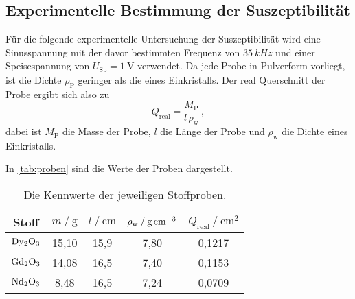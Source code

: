 \subsection{Experimentelle Bestimmung der Suszeptibilität}

Für die folgende experimentelle Untersuchung der Suszeptibilität wird eine Sinusspannung 
mit der davor bestimmten Frequenz von $\qty{35}{kHz}$ und einer Speisespannung von $U_\text{Sp} = \qty{1}{\volt}$ verwendet.
Da jede Probe in Pulverform vorliegt, ist die Dichte $\rho_\text{P}$ geringer als die eines Einkristalls.
Der real Querschnitt der Probe ergibt sich also zu
\begin{equation}
  Q_\text{real} = \frac{M_\text{P}}{l \, \rho_\text{w}} \, ,
\end{equation}
dabei ist $M_\text{P}$ die Masse der Probe, $l$ die Länge der Probe und $\rho_\text{w}$ die Dichte eines Einkristalls.

In \autoref{tab:proben} sind die Werte der Proben dargestellt.
\begin{table}
  \centering
  \caption{Die Kennwerte der jeweiligen Stoffproben.}
  \label{tab:proben}
  \begin{tabular}{c c c c c}
    \toprule
    Stoff &   
    $m \mathbin{/} \mathrm{g}$ &
    $l \mathbin{/} \mathrm{cm}$ &
    $\rho_\text{w} \mathbin{/} \unit[per-mode=reciprocal]{\gram\per\cubic\centi\meter}$ & 
    $Q_\text{real} \mathbin{/} \unit{\centi\meter\squared}$ \\
    \midrule
    $\ce{Dy2O3}$ & 15,10 &  15,9 & 7,80 & 0,1217 \\
    $\ce{Gd2O3}$ & 14,08 &  16,5 & 7,40 & 0,1153 \\
    $\ce{Nd2O3}$ &  8,48 &  16,5 & 7,24 & 0,0709 \\
    \bottomrule
  \end{tabular}
\end{table}

